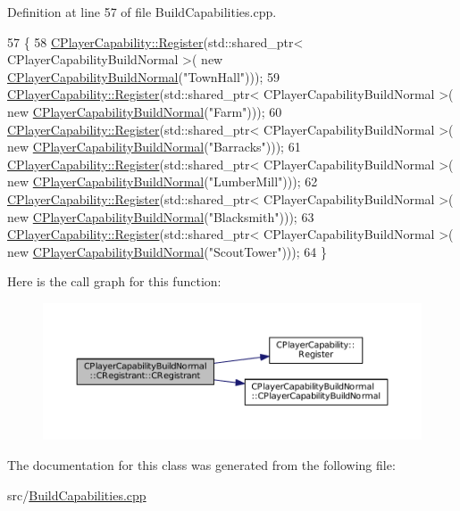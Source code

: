 Definition at line 57 of file Build\+Capabilities.\+cpp.


\begin{DoxyCode}
57                                                     \{
58     \hyperlink{classCPlayerCapability_a7e298018dcde2684451add3cfff065f7}{CPlayerCapability::Register}(std::shared\_ptr< CPlayerCapabilityBuildNormal >(\textcolor{keyword}{
      new} \hyperlink{classCPlayerCapabilityBuildNormal_a36157bf1a2875f0831b646dd2313a464}{CPlayerCapabilityBuildNormal}(\textcolor{stringliteral}{"TownHall"})));   
59     \hyperlink{classCPlayerCapability_a7e298018dcde2684451add3cfff065f7}{CPlayerCapability::Register}(std::shared\_ptr< CPlayerCapabilityBuildNormal >(\textcolor{keyword}{
      new} \hyperlink{classCPlayerCapabilityBuildNormal_a36157bf1a2875f0831b646dd2313a464}{CPlayerCapabilityBuildNormal}(\textcolor{stringliteral}{"Farm"})));
60     \hyperlink{classCPlayerCapability_a7e298018dcde2684451add3cfff065f7}{CPlayerCapability::Register}(std::shared\_ptr< CPlayerCapabilityBuildNormal >(\textcolor{keyword}{
      new} \hyperlink{classCPlayerCapabilityBuildNormal_a36157bf1a2875f0831b646dd2313a464}{CPlayerCapabilityBuildNormal}(\textcolor{stringliteral}{"Barracks"})));   
61     \hyperlink{classCPlayerCapability_a7e298018dcde2684451add3cfff065f7}{CPlayerCapability::Register}(std::shared\_ptr< CPlayerCapabilityBuildNormal >(\textcolor{keyword}{
      new} \hyperlink{classCPlayerCapabilityBuildNormal_a36157bf1a2875f0831b646dd2313a464}{CPlayerCapabilityBuildNormal}(\textcolor{stringliteral}{"LumberMill"})));
62     \hyperlink{classCPlayerCapability_a7e298018dcde2684451add3cfff065f7}{CPlayerCapability::Register}(std::shared\_ptr< CPlayerCapabilityBuildNormal >(\textcolor{keyword}{
      new} \hyperlink{classCPlayerCapabilityBuildNormal_a36157bf1a2875f0831b646dd2313a464}{CPlayerCapabilityBuildNormal}(\textcolor{stringliteral}{"Blacksmith"})));
63     \hyperlink{classCPlayerCapability_a7e298018dcde2684451add3cfff065f7}{CPlayerCapability::Register}(std::shared\_ptr< CPlayerCapabilityBuildNormal >(\textcolor{keyword}{
      new} \hyperlink{classCPlayerCapabilityBuildNormal_a36157bf1a2875f0831b646dd2313a464}{CPlayerCapabilityBuildNormal}(\textcolor{stringliteral}{"ScoutTower"})));
64 \}
\end{DoxyCode}
Here is the call graph for this function\+:\nopagebreak
\begin{figure}[H]
\begin{center}
\leavevmode
\includegraphics[width=350pt]{classCPlayerCapabilityBuildNormal_1_1CRegistrant_af4a7b74e621f41f2ccbadccc7f9a5a57_cgraph}
\end{center}
\end{figure}


The documentation for this class was generated from the following file\+:\begin{DoxyCompactItemize}
\item 
src/\hyperlink{BuildCapabilities_8cpp}{Build\+Capabilities.\+cpp}\end{DoxyCompactItemize}
